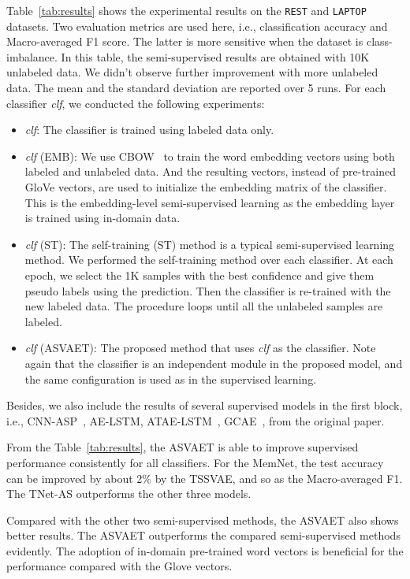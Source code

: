 \documentclass[11pt,a4paper]{article}
\begin{document}
Table~\ref{tab:results} shows the experimental results on the \texttt{REST} and \texttt{LAPTOP} datasets.
Two evaluation metrics are used here, i.e., classification accuracy and Macro-averaged F1 score.
The latter is more sensitive when the dataset is class-imbalance.
In this table, the semi-supervised results are obtained with 10K unlabeled data.
We didn't observe further improvement with more unlabeled data.
The mean and the standard deviation are reported over 5 runs. For each classifier \emph{clf}, we conducted the following experiments:
\begin{itemize}
	\item \emph{clf}: The classifier is trained using labeled data only.
	\item \emph{clf} (EMB): We use CBOW~\cite{DBLP:journals/corr/abs-1301-3781} to train the word embedding vectors using both labeled and unlabeled data. And the resulting vectors, instead of pre-trained GloVe vectors, are used to initialize the embedding matrix of the classifier. This is the embedding-level semi-supervised learning as the embedding layer is trained using in-domain data.\
	\item \emph{clf} (ST): The self-training (ST) method is a typical semi-supervised learning method. We performed the self-training method over each classifier. At each epoch, we select the 1K samples with the best confidence and give them pseudo labels using the prediction. Then the classifier is re-trained with the new labeled data. The procedure loops until all the unlabeled samples are labeled.
	\item \emph{clf} (ASVAET): The proposed method that uses \emph{clf} as the classifier. Note again that the classifier is an independent module in the proposed model, and the same configuration is used as in the supervised learning. \end{itemize}

Besides, we also include the results of several supervised models in the first block, i.e., CNN-ASP~\cite{DBLP:conf/acl/LamLSB18}, AE-LSTM, ATAE-LSTM~\cite{DBLP:conf/emnlp/WangHZZ16}, GCAE~\cite{DBLP:conf/acl/LiX18}, from the original paper.

From the Table~\ref{tab:results}, the ASVAET is able to improve supervised performance consistently for all classifiers. For the MemNet, the test accuracy can be improved by about 2\% by the TSSVAE, and so as the Macro-averaged F1. The TNet-AS outperforms the other three models.


Compared with the other two semi-supervised methods, the ASVAET also shows better results.
The ASVAET outperforms the compared semi-supervised methods evidently. The adoption of in-domain pre-trained word vectors is beneficial for the performance compared with the Glove vectors. 
\end{document}
